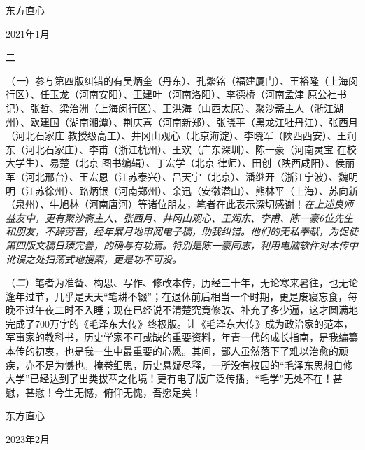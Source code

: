\documentclass[../../dazhuan.tex]{subfiles}
\begin{document}
\vspace{\baselineskip}

\hspace{18em} 东方直心

\hspace{18em} 2021年1月


\begin{center}
    \kaishu 二
\end{center}  
 
（\emph{一}）参与第四版纠错的有吴炳奎（丹东）、孔繁铭（福建厦门）、王裕隆（上海闵行区）、任玉龙（河南安阳）、王建叶（河南洛阳）、李德桥（河南孟津 原公社书记）、张哲、梁治洲（上海闵行区）、王洪海（山西太原）、聚沙斋主人（浙江湖州）、欧建国（湖南湘潭）、荆庆喜（河南新郑）、张晓平（黑龙江牡丹江）、张西月（河北石家庄 教授级高工）、井冈山观心（北京海淀）、李晓军（陕西西安）、王润东（河北石家庄）、李甫（浙江杭州）、王欢（广东深圳）、陈一豪（河南灵宝 在校大学生）、易楚（北京 图书编辑）、丁宏学（北京 律师）、田创（陕西咸阳）、侯丽军（河北邢台）、王宏恩（江苏泰兴）、吕天宇（北京）、潘继开（浙江宁波）、魏明明（江苏徐州）、路炳银（河南郑州）、余迅（安徽潜山）、熊林平（上海）、苏向新（泉州）、牛旭林（河南唐河）等诸位朋友，笔者在此表示深切感谢！\emph{在上述良师益友中，更有聚沙斋主人、张西月、井冈山观心、王润东、李甫、陈一豪6位先生和朋友，不辞劳苦，经年累月地审阅电子稿，助我纠错。他们的无私奉献，为促使第四版文稿日臻完善，的确与有功焉。特别是陈一豪同志，利用电脑软件对本传中讹误之处扫荡式地搜索，更是功不可没。}

（\emph{二}）笔者为准备、构思、写作、修改本传，历经三十年，无论寒来暑往，也无论逢年过节，几乎是天天“笔耕不辍”；在退休前后相当一个时期，更是废寝忘食，每晚不过午夜二时不入睡；现在已经说不清楚究竟修改、补充了多少遍，这才圆满地完成了700万字的《毛泽东大传》终极版。让《毛泽东大传》成为政治家的范本，军事家的教科书，历史学家不可或缺的重要资料，年青一代的成长指南，是我编纂本传的初衷，也是我一生中最重要的心愿。其间，鄙人虽然落下了难以治愈的顽疾，亦不足为憾也。掩卷细思，历史悬疑尽释，一所没有校园的“毛泽东思想自修大学”已经达到了出类拔萃之化境！更有电子版广泛传播，“毛学”无处不在！甚慰，甚慰！今生无憾，俯仰无愧，吾愿足矣！

\vspace{\baselineskip}

\hspace{18em} 东方直心

\hspace{18em} 2023年2月
    
\end{document}
